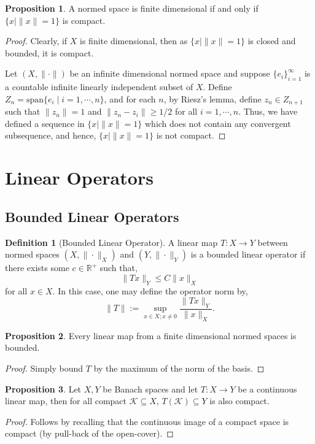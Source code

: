 \documentclass[]{article}
\theoremstyle{definition}
\theoremstyle{definition}
\newtheorem{definition}{Definition}[section]
\newtheorem{proposition}{Proposition}[section]
\begin{document}
\begin{proposition}
  A normed space is finite dimensional if and only if 
  \(\{x \mid \|x\| = 1\}\) is compact.
\end{proposition}
\begin{proof}
  Clearly, if \(X\) is finite dimensional, then as \(\{x \mid \|x\| = 1\}\) is 
  closed and bounded, it is compact.

  Let \((X, \|\cdot\|)\) be an infinite dimensional normed space and suppose 
  \(\{e_i\}_{i = 1}^\infty\) is a countable infinite linearly independent subset 
  of \(X\). Define \(Z_n = \text{span}\{e_i \mid i = 1, \cdots, n\}\), and 
  for each \(n\), by Riesz's lemma, define \(z_n \in Z_{n + 1}\) such that 
  \(\|z_n\| = 1\) and \(\|z_n - z_i\| \ge 1 / 2\) for all \(i = 1, \cdots, n\).
  Thus, we have defined a sequence in \(\{x \mid \|x\| = 1\}\) which does not 
  contain any convergent subsequence, and hence, \(\{x \mid \|x\| = 1\}\) is not 
  compact.
\end{proof}

\newpage
\section{Linear Operators}

\subsection{Bounded Linear Operators}

\begin{definition}[Bounded Linear Operator]
  A linear map \(T : X \to Y\) between normed spaces \((X, \|\cdot\|_X)\) and 
  \((Y, \|\cdot\|_Y)\) is a bounded linear operator if there exists some 
  \(c \in \mathbb{R}^+\) such that,
  \[\|Tx\|_Y \le C\|x\|_X\]
  for all \(x \in X\). In this case, one may define the operator norm by,
  \[\|T\| := \sup_{x \in X; x \neq 0} \frac{\|Tx\|_Y}{\|x\|_X}.\]
\end{definition}

\begin{proposition}
  Every linear map from a finite dimensional normed spaces is bounded.
\end{proposition}
\begin{proof}
  Simply bound \(T\) by the maximum of the norm of the basis.
\end{proof}

\begin{proposition}
  Let \(X, Y\) be Banach spaces and let \(T : X \to Y\) be a continuous linear map,
  then for all compact \(\mathcal{K} \subseteq X\), \(T(\mathcal{K}) \subseteq Y\) 
  is also compact.
\end{proposition}
\begin{proof}
  Follows by recalling that the continuous image of a compact space is compact 
  (by pull-back of the open-cover).
\end{proof}
\end{document}
